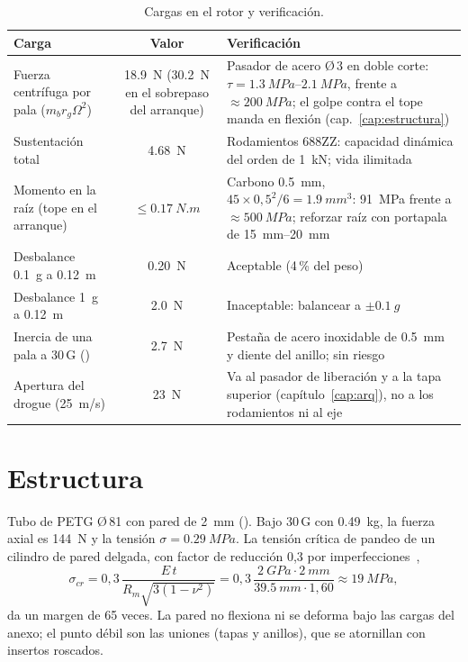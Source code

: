 \begin{table}[H]
\centering\small
\caption{Cargas en el rotor y verificación.}\label{tab:cargas}
\begin{tabularx}{\textwidth}{@{}lcY@{}}
\toprule
\textbf{Carga} & \textbf{Valor} & \textbf{Verificación}\\\midrule
Fuerza centrífuga por pala ($m_b r_g\Omega^2$) & \SI{18.9}{N} (\SI{30.2}{N} en el sobrepaso del arranque) & Pasador de acero Ø\,3 en doble corte: $\tau=\SIrange{1.3}{2.1}{MPa}$, frente a $\approx\SI{200}{MPa}$; el golpe contra el tope manda en flexión (cap.~\ref{cap:estructura})\\
Sustentación total & \SI{4.68}{N} & Rodamientos 688ZZ: capacidad dinámica del orden de \SI{1}{kN}; vida ilimitada\\
Momento en la raíz (tope en el arranque) & $\le\SI{0.17}{N.m}$ & Carbono \SI{0.5}{mm}, $45\times0{,}5^2/6=\SI{1.9}{mm^3}$: \SI{91}{MPa} frente a $\approx\SI{500}{MPa}$; reforzar raíz con portapala de \SIrange{15}{20}{mm}\\
Desbalance \SI{0.1}{g} a \SI{0.12}{m} & \SI{0.20}{N} & Aceptable (4\,\% del peso)\\
Desbalance \SI{1}{g} a \SI{0.12}{m} & \SI{2.0}{N} & Inaceptable: balancear a $\pm\SI{0.1}{g}$\\
Inercia de una pala a 30\,G () & \SI{2.7}{N} & Pestaña de acero inoxidable de \SI{0.5}{mm} y diente del anillo; sin riesgo\\
Apertura del drogue (\SI{25}{m/s}) & \SI{23}{N} & Va al pasador de liberación y a la tapa superior (capítulo~\ref{cap:arq}), no a los rodamientos ni al eje\\
\bottomrule
\end{tabularx}
\end{table}

\section{Estructura}\label{sec:estructura}
Tubo de PETG Ø\,81 con pared de \SI{2}{mm} (). Bajo 30\,G con \SI{0.49}{kg}, la
fuerza axial es \SI{144}{N} y la tensión $\sigma=\SI{0.29}{MPa}$. La tensión crítica de
pandeo de un cilindro de pared delgada, con factor de reducción 0,3 por
imperfecciones~\cite{timoshenko1961},
\begin{equation}
  \sigma_{cr} = 0{,}3\,\frac{E\,t}{R_m\sqrt{3(1-\nu^2)}}
  = 0{,}3\,\frac{\SI{2}{GPa}\cdot\SI{2}{mm}}{\SI{39.5}{mm}\cdot1{,}60} \approx \SI{19}{MPa},
\end{equation}
da un margen de 65 veces. La pared no flexiona ni se deforma bajo las cargas del anexo; el
punto débil son las uniones (tapas y anillos), que se atornillan con insertos roscados.

